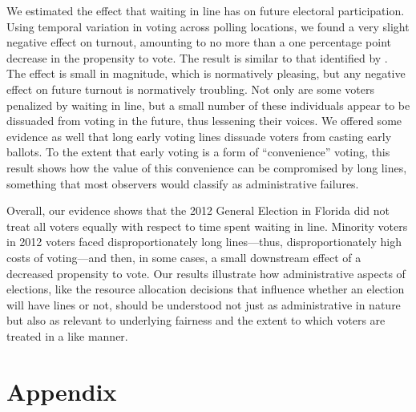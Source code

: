 \documentclass[12pt,titlepage]{article}
\begin{document}
We estimated the effect that waiting in line has on future electoral
participation.  Using temporal variation in voting across polling
locations, we found a very slight negative effect on turnout,
amounting to no more than a one percentage point decrease in the
propensity to vote. The result is similar to that identified by
\citet{pettigrew:racegapwaittimes}.  The effect is small in magnitude,
which is normatively pleasing, but any negative effect on future
turnout is normatively troubling.  Not only are some voters penalized
by waiting in line, but a small number of these individuals appear to
be dissuaded from voting in the future, thus lessening their voices.
We offered some evidence as well that long early voting lines dissuade
voters from casting early ballots.  To the extent that early voting is
a form of ``convenience'' voting, this result shows how the value of
this convenience can be compromised by long lines, something that most
observers would classify as administrative failures.

Overall, our evidence shows that the 2012 General Election in Florida
did not treat all voters equally with respect to time spent waiting in
line.  Minority voters in 2012 voters faced disproportionately long
lines---thus, disproportionately high costs of voting---and then, in
some cases, a small downstream effect of a decreased propensity to
vote.  Our results illustrate how administrative aspects of elections,
like the resource allocation decisions that influence whether an
election will have lines or not, should be understood not just as
administrative in nature but also as relevant to underlying fairness
and the extent to which voters are treated in a like manner.




% 

\clearpage
\newpage




\newpage
\appendix
\section*{Appendix}


\end{document}
